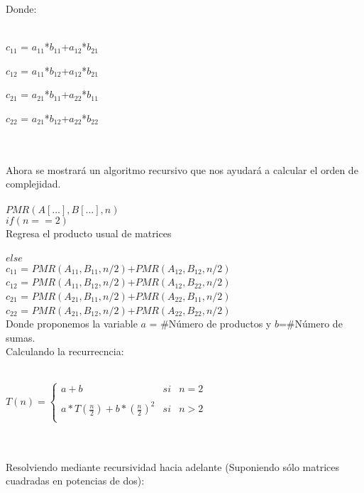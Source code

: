 \documentclass[12pt,twoside]{article}
\begin{document}
Donde:\\\\
\centerline{$c_{11}$ = $a_{11}$*$b_{11}$+$a_{12}$*$b_{21}$}
\centerline{$c_{12}$ = $a_{11}$*$b_{12}$+$a_{12}$*$b_{21}$}
\centerline{$c_{21}$ = $a_{21}$*$b_{11}$+$a_{22}$*$b_{11}$}
\centerline{$c_{22}$ = $a_{21}$*$b_{12}$+$a_{22}$*$b_{22}$}\\\\
Ahora se mostrar\'a un algoritmo recursivo que nos ayudar\'a a calcular el orden de complejidad.\\\\
\hspace*{1cm}$PMR(A[...],B[...],n)$\\
\hspace*{1cm}$if(n==2)$\\
\hspace*{2cm}Regresa el producto usual de matrices\\\\
\hspace*{1cm}$else$\\
\hspace*{2cm}$c_{11}$ = $PMR(A_{11},B_{11},n/2)$+$PMR(A_{12},B_{12},n/2)$\\
\hspace*{2cm}$c_{12}$ = $PMR(A_{11},B_{12},n/2)$+$PMR(A_{12},B_{22},n/2)$\\
\hspace*{2cm}$c_{21}$ = $PMR(A_{21},B_{11},n/2)$+$PMR(A_{22},B_{11},n/2)$\\
\hspace*{2cm}$c_{22}$ = $PMR(A_{21},B_{12},n/2)$+$PMR(A_{22},B_{22},n/2)$\\
Donde proponemos la variable $a$ = $\#$N\'umero de productos y $b$=$\#$N\'umero de sumas.\\
Calculando la recurrecncia:\\\\
\centerline{$T(n)= \left\{\begin{array}{lcc}
             a+b &   si  & n = 2 \\
             \\ a*T(\frac{n}{2}) + b*(\frac{n}{2})^{2} &  si & n > 2\\
             \end{array}
   \right.$}\\\\
Resolviendo mediante recursividad hacia adelante (Suponiendo s\'olo matrices cuadradas en potencias de dos):\\\\
\end{document}
